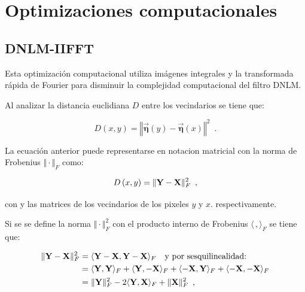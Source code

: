 \section{Optimizaciones computacionales}
\label{ch:marco_opt}

\subsection{DNLM-IIFFT}
\label{ch:marco_dnlmifft}

Esta optimización computacional utiliza im\'agenes integrales y la transformada r\'apida de Fourier para disminuir la complejidad computacional del filtro DNLM. 



Al analizar la distancia euclidiana $D$ entre los vecindarios se tiene que:

\begin{equation}
D\left(x,y\right)=\left\Vert \vec{\boldsymbol{\eta}}\left(y\right)-\vec{\boldsymbol{\eta}}\left(x\right)\right\Vert^2 \enspace . 
\end{equation}

La ecuación anterior puede representarse en notacion matricial con la norma de Frobenius $\Vert \cdot \Vert_{F}$ como:


\begin{equation}
D\left(x,y\right)=\Vert \mathbf{Y} - \mathbf{X} \Vert_{F}^2 \enspace ,
\label{eq:distMat}
\end{equation}

con  y  las matrices de los vecindarios de los pixeles $y$ y $x$. respectivamente.

Si se se define la norma $\Vert \cdot \Vert_{F}^2$ con el producto interno de Frobenius $\langle\,,\rangle_{F}$ se tiene que:

\begin{equation}\label{eq:frobProd}
\begin{split}
\Vert \mathbf{Y} - \mathbf{X} \Vert_{F}^2 & = \langle\mathbf{Y} - \mathbf{X},\mathbf{Y} - \mathbf{X}\rangle_{F}  \quad \text{y por sesquilinealidad:}\\ 
& = \langle\mathbf{Y},\mathbf{Y}\rangle_{F} + \langle\mathbf{Y},-\mathbf{X}\rangle_{F} + \langle-\mathbf{X},\mathbf{Y}\rangle_{F} + \langle-\mathbf{X},-\mathbf{X}\rangle_{F}\\
& = \Vert \mathbf{Y} \Vert_{F}^2 -2\langle\mathbf{Y},\mathbf{X}\rangle_{F} + \Vert \mathbf{X} \Vert_{F}^2 \enspace ,
\end{split} 
\end{equation}


